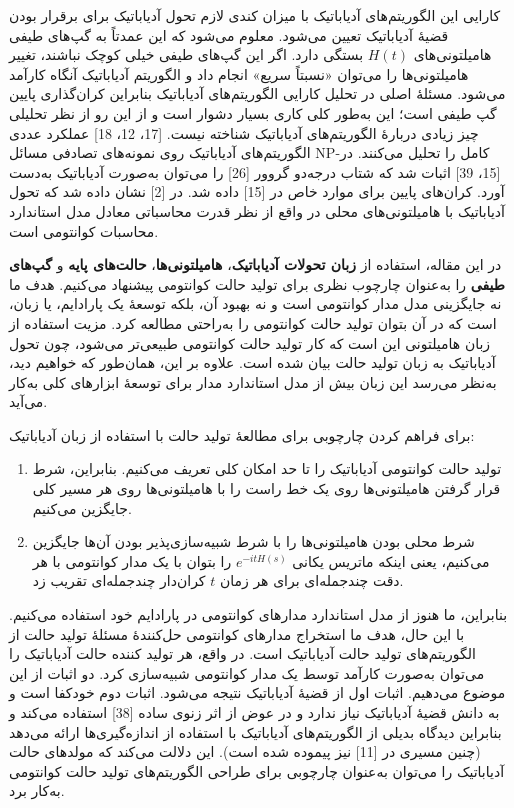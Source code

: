 کارایی این الگوریتم‌های آدیاباتیک با میزان کندی لازم تحول آدیاباتیک برای برقرار بودن قضیهٔ آدیاباتیک تعیین می‌شود. معلوم می‌شود که این عمدتاً به گپ‌های طیفی هامیلتونی‌های $H(t)$ بستگی دارد. اگر این گپ‌های طیفی خیلی کوچک نباشند، تغییر هامیلتونی‌ها را می‌توان «نسبتاً سریع» انجام داد و الگوریتم آدیاباتیک آنگاه کارآمد می‌شود. مسئلهٔ اصلی در تحلیل کارایی الگوریتم‌های آدیاباتیک بنابراین کران‌گذاری پایین گپ طیفی است؛ این به‌طور کلی کاری بسیار دشوار است و از این رو از نظر تحلیلی چیز زیادی دربارهٔ الگوریتم‌های آدیاباتیک شناخته نیست. [17، 12، 18] عملکرد عددی الگوریتم‌های آدیاباتیک روی نمونه‌های تصادفی مسائل NP-کامل را تحلیل می‌کنند. در [15، 39] اثبات شد که شتاب درجه‌دو گروور [26] را می‌توان به‌صورت آدیاباتیک به‌دست آورد. کران‌های پایین برای موارد خاص در [15] داده شد. در [2] نشان داده شد که تحول آدیاباتیک با هامیلتونی‌های محلی در واقع از نظر قدرت محاسباتی معادل مدل استاندارد محاسبات کوانتومی است.

در این مقاله، استفاده از
\textbf{زبان تحولات آدیاباتیک}، 
\textbf{هامیلتونی‌ها}، 
\textbf{حالت‌های پایه}
 و 
\textbf{گپ‌های طیفی} 
را به‌عنوان چارچوب نظری برای تولید حالت کوانتومی پیشنهاد می‌کنیم. هدف ما نه جایگزینی مدل مدار کوانتومی است و نه بهبود آن، بلکه توسعهٔ یک پارادایم، یا زبان، است که در آن بتوان تولید حالت کوانتومی را به‌راحتی مطالعه کرد. مزیت استفاده از زبان هامیلتونی این است که کار تولید حالت کوانتومی طبیعی‌تر می‌شود، چون تحول آدیاباتیک به زبان تولید حالت بیان شده است. علاوه بر این، همان‌طور که خواهیم دید، به‌نظر می‌رسد این زبان بیش از مدل استاندارد مدار برای توسعهٔ ابزارهای کلی به‌کار می‌آید.

برای فراهم کردن چارچوبی برای مطالعهٔ تولید حالت با استفاده از زبان آدیاباتیک:
\begin{enumerate}
	\item 
	تولید حالت کوانتومی آدیاباتیک را تا حد امکان کلی تعریف می‌کنیم. بنابراین، شرط قرار گرفتن هامیلتونی‌ها روی یک خط راست را با هامیلتونی‌ها روی هر مسیر کلی جایگزین می‌کنیم.
	\item
	شرط محلی بودن هامیلتونی‌ها را با شرط شبیه‌سازی‌پذیر بودن آن‌ها جایگزین می‌کنیم، یعنی اینکه ماتریس یکانی $e^{-itH(s)}$ را بتوان با یک مدار کوانتومی با هر دقت چندجمله‌ای برای هر زمان $t$ کران‌دار چندجمله‌ای تقریب زد. 
\end{enumerate}
 

 بنابراین، ما هنوز از مدل استاندارد مدارهای کوانتومی در پارادایم خود استفاده می‌کنیم. با این حال، هدف ما استخراج مدارهای کوانتومی حل‌کنندهٔ مسئلهٔ تولید حالت از الگوریتم‌های تولید حالت آدیاباتیک است. در واقع، هر تولید کننده حالت آدیاباتیک را می‌توان به‌صورت کارآمد توسط یک مدار کوانتومی شبیه‌سازی کرد. دو اثبات از این موضوع می‌دهیم. اثبات اول از قضیهٔ آدیاباتیک نتیجه می‌شود. اثبات دوم خودکفا است و به دانش قضیهٔ آدیاباتیک نیاز ندارد و در عوض از اثر زنوی ساده [38] استفاده می‌کند و بنابراین دیدگاه بدیلی از الگوریتم‌های آدیاباتیک با استفاده از اندازه‌گیری‌ها ارائه می‌دهد (چنین مسیری در [11] نیز پیموده شده است). این دلالت می‌کند که مولدهای حالت آدیاباتیک را می‌توان به‌عنوان چارچوبی برای طراحی الگوریتم‌های تولید حالت کوانتومی به‌کار برد.

